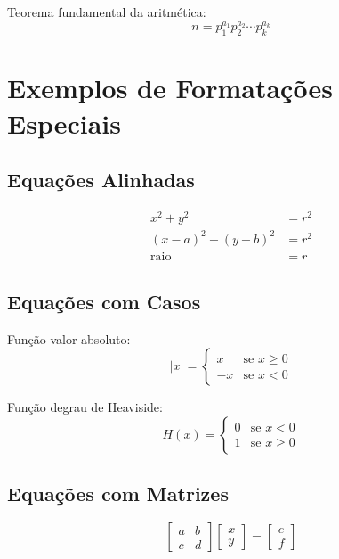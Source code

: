 Teorema fundamental da aritmética:
\begin{equation}
n = p_1^{a_1} p_2^{a_2} \cdots p_k^{a_k}
\end{equation}


\section{Exemplos de Formatações Especiais}

\subsection{Equações Alinhadas}

\begin{align}
x^2 + y^2 &= r^2 \\
(x-a)^2 + (y-b)^2 &= r^2 \\
\text{raio} &= r
\end{align}

\subsection{Equações com Casos}

Função valor absoluto:
\begin{equation}
|x| = \begin{cases}
x & \text{se } x \geq 0 \\
-x & \text{se } x < 0
\end{cases}
\end{equation}

Função degrau de Heaviside:
\begin{equation}
H(x) = \begin{cases}
0 & \text{se } x < 0 \\
1 & \text{se } x \geq 0
\end{cases}
\end{equation}

\subsection{Equações com Matrizes}

\begin{equation}
\begin{bmatrix}
a & b \\
c & d
\end{bmatrix}
\begin{bmatrix}
x \\
y
\end{bmatrix}
=
\begin{bmatrix}
e \\
f
\end{bmatrix}
\end{equation}

